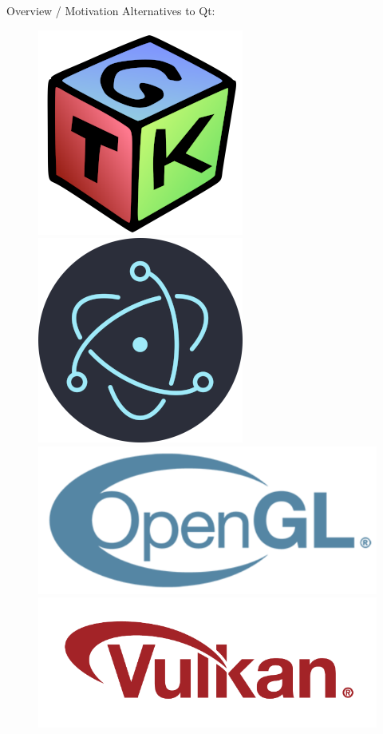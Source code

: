 \documentclass[11pt]{beamer}
\begin{document}
\begin{frame}{Overview / Motivation}
 Alternatives to Qt:
 \begin{figure}
  \includegraphics[height=0.15\textheight]{assets/logo-gtk}
  \includegraphics[height=0.15\textheight]{assets/logo-electron}
  \includegraphics[height=0.15\textheight]{assets/logo-opengl}
  \includegraphics[height=0.15\textheight]{assets/logo-vulkan}
 \end{figure}
 

\end{frame}
\end{document}
